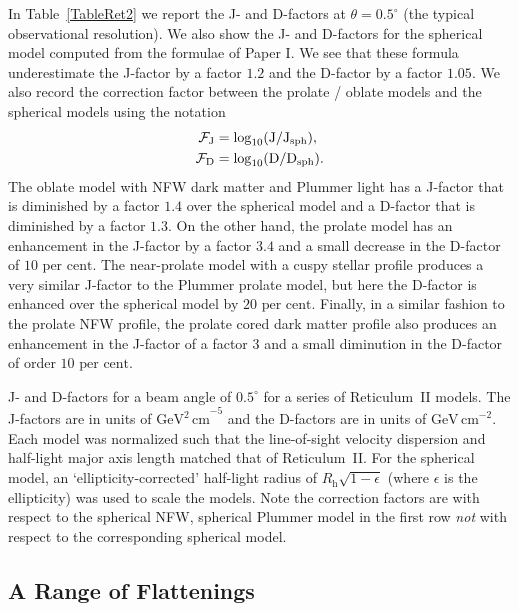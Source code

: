 \documentclass[prd,twocolumn,showpacs,preprintnumbers,superscriptaddress,nofootinbib,amsmath,amssymb,nobalancelastpage]{revtex4}
\def\percent{\text{ per cent}}
\def\percent{\text{ per cent}}
\newcommand{\Df}{{\rm D}}
\newcommand{\Jf}{{\rm J}}
\begin{document}
In Table~\ref{TableRet2} we report the J- and D-factors at
$\theta=0.5^\circ$ (the typical observational resolution). We also
show the J- and D-factors for the spherical model computed from the
formulae of Paper I. We see that these formula underestimate the
J-factor by a factor $1.2$ and the D-factor by a factor $1.05$. We also
record the correction factor between the prolate / oblate models and the
spherical models using the notation
%
\begin{equation}
\begin{split}
\mathcal{F}_\Jf &= \log_{10}(\Jf/\Jf_\mathrm{sph}),\\
\mathcal{F}_\Df &= \log_{10}(\Df/\Df_\mathrm{sph}).
\end{split}
\label{eq:defcorrfactors}
\end{equation}
%
The oblate model with NFW dark matter and Plummer light has a J-factor
that is diminished by a factor $1.4$ over the spherical model and a
D-factor that is diminished by a factor $1.3$. On the other hand, the
prolate model has an enhancement in the J-factor by a factor $3.4$ and
a small decrease in the D-factor of $10\percent$. The near-prolate
model with a cuspy stellar profile produces a very similar J-factor to
the Plummer prolate model, but here the D-factor is enhanced over the
spherical model by $20\percent$. Finally, in a similar fashion to the
prolate NFW profile, the prolate cored dark matter profile also
produces an enhancement in the J-factor of a factor $3$ and a small
diminution in the D-factor of order $10\percent$.

\begin{table}
\caption{J- and D-factors for a beam angle of $0.5^\circ$ for a series
  of Reticulum~II models. The J-factors are in units of $\mathrm{GeV^2\,cm}^{-5}$ and the D-factors are in units of $\mathrm{GeV\,cm}^{-2}$. Each model was normalized such that the
  line-of-sight velocity dispersion and half-light major axis length matched that
  of Reticulum~II. For the spherical model, an `ellipticity-corrected' half-light radius of $R_\mathrm{h}\sqrt{1-\epsilon}$ (where $\epsilon$ is the ellipticity) was used to scale the models. Note the correction factors are with respect to the spherical NFW, spherical Plummer model in the first row \emph{not} with respect to the corresponding spherical model.}

\label{TableRet2}
\end{table}

\subsection{A Range of Flattenings}
\end{document}
